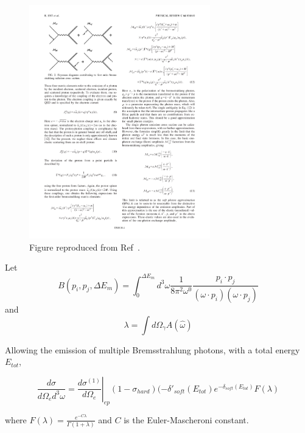 \begin{figure}[!h]
    \centering
    \includegraphics[width=0.7\textwidth]{chap1/single_photon_brem_feynman.pdf}
    \caption{
             Figure reproduced from Ref~\cite{Ent_2001}.
             }
    \label{fig:single_photon_brem_feynman}
\end{figure}

Let
\begin{equation}
    B(p_i, p_j, \Delta E_m) = \int_0^{\Delta E_m} d^3 \omega
    \frac{1}{8\pi^2\omega^0}
    \frac{p_i \cdot p_j}{(\omega \cdot p_i)(\omega \cdot p_j)}
\end{equation}
and
\begin{equation}
    \lambda = \int d\Omega_\gamma A(\hat{\omega})
\end{equation}

Allowing the emission of multiple Bremsstrahlung photons, with a total energy
$E_{tot}$,

\begin{equation}
    \frac{d\sigma}{d\Omega_e d^3\omega} =
        \left.\frac{d \sigma^{(1)}}{d \Omega_{e}}\right|_{e p}
        (1-\sigma_{hard})
        (-\delta'_{soft}(E_{tot})
        e^{-\delta_{soft}(E_{tot})}
        F(\lambda)
\end{equation}

where $F(\lambda)=\frac{e^{-C\lambda}}{\Gamma(1+\lambda)}$ and $C$ is the
Euler-Mascheroni constant.


